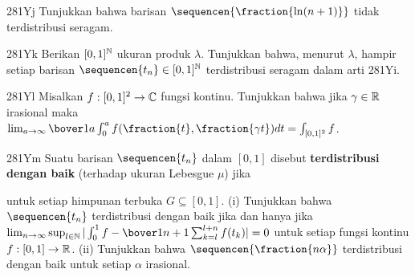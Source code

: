 {\spheader 281Yj Tunjukkan bahwa barisan $\sequencen{\fraction{\ln(n+1)}}$
tidak terdistribusi seragam.
      
\spheader 281Yk Berikan $[0,1]^{\Bbb N}$ ukuran produk $\lambda$. Tunjukkan
bahwa, menurut $\lambda$, hampir setiap barisan
$\sequencen{t_n}\in[0,1]^{\Bbb N}$ terdistribusi seragam dalam arti 281Yi.
      
\spheader 281Yl Misalkan $f:[0,1]^2\to\Bbb C$ fungsi kontinu. Tunjukkan bahwa
jika $\gamma\in\Bbb R$ irasional maka
$\lim_{a\to\infty}\bover1a\int_0^af(\fraction{t},\fraction{\gamma t})dt
\penalty-100=\int_{[0,1]^2}f$.
 
\spheader 281Ym Suatu barisan $\sequencen{t_n}$ dalam $[0,1]$ disebut
{\bf terdistribusi dengan baik} (terhadap ukuran Lebesgue $\mu$) jika
      
      
\noindent untuk setiap himpunan terbuka $G\subseteq[0,1]$.
(i) Tunjukkan bahwa $\sequencen{t_n}$ terdistribusi dengan baik jika dan hanya jika
$\lim_{n\to\infty}\sup_{l\in\Bbb N}
|\int_0^1f-\bover1{n+1}\sum_{k=l}^{l+n}f(t_k)|=0$ untuk setiap fungsi kontinu
$f:[0,1]\to\Bbb R$.
(ii) Tunjukkan bahwa $\sequencen{\fraction{n\alpha}}$ terdistribusi dengan baik
untuk setiap $\alpha$ irasional.
}%
      
